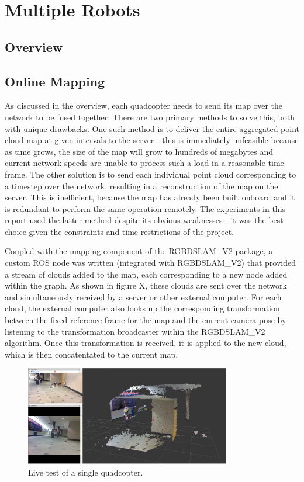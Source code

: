 \documentclass[letterpaper, oneside, 10pt]{report}
\begin{document}
\chapter{Multiple Robots}

\section{Overview}

\section{Online Mapping}
\noindent As discussed in the overview, each quadcopter needs to send its map over the network to be fused together. There are two primary methods to solve this, both with unique drawbacks. One such method is to deliver the entire aggregated point cloud map at given intervals to the server - this is immediately unfeasible because as time grows, the size of the map will grow to hundreds of megabytes and current network speeds are unable to process such a load in a reasonable time frame. The other solution is to send each individual point cloud corresponding to a timestep over the network, resulting in a reconstruction of the map on the server. This is inefficient, because the map has already been built onboard and it is redundant to perform the same operation remotely. The experiments in this report used the latter method despite its obvious weaknesses - it was the best choice given the constraints and time restrictions of the project.

Coupled with the mapping component of the RGBDSLAM_V2 package, a custom ROS node was written (integrated with RGBDSLAM_V2) that provided a stream of clouds added to the map, each corresponding to a new node added within the graph. As shown in figure X, these clouds are sent over the network and simultaneously received by a server or other external computer. For each cloud, the external computer also looks up the corresponding transformation between the fixed reference frame for the map and the current camera pose by listening to the transformation broadcaster within the RGBDSLAM_V2 algorithm. Once this transformation is received, it is applied to the new cloud, which is then concatentated to the current map.

\begin{figure}[h]
 \caption{Live test of a single quadcopter.}
 \centering
   \includegraphics[width=0.8\textwidth]{images/single_test}
\end{figure}
\end{document}
